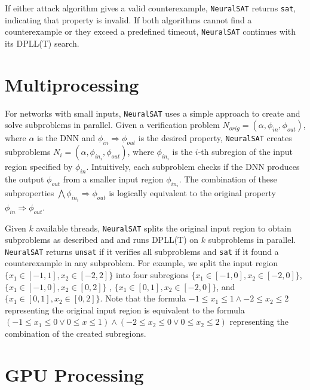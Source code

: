 \documentclass[oneside,11pt,dvipsnames]{book}
\numberwithin{equation}{section}
\theoremstyle{definition}
\theoremstyle{remark}
\newcommand{\tvn}[1]{\iftoggle{usecomment}{{\color{red}{[TVN]: #1}}}{}}
\newcommand{\tool}{\texttt{NeuralSAT}}
\begin{document}
If either attack algorithm gives a valid counterexample, \tool{} returns \texttt{sat}, indicating that property is invalid. If both algorithms cannot find a counterexample or they exceed a predefined timeout, \tool{} continues with its DPLL(T) search.



\section{Multiprocessing} \label{sec:input_split}
\tvn{Do we still use this?  or we use the Parallel DPLL(T) in~\autoref{sec:parallel-search} instead?}
For networks with small inputs, \tool{} uses a simple approach to create and solve subproblems in parallel.
Given a verification problem $N_{orig} = (\alpha, \phi_{in}, \phi_{out})$, where $\alpha$ is the DNN and $\phi_{in} \Rightarrow \phi_{out}$ is the desired property, \tool{} creates subproblems $N_i = (\alpha, \phi_{{in}_i}, \phi_{out})$, where $\phi_{{in}_i}$ is the $i$-th subregion of the input region specified by $\phi_{in}$.
Intuitively, each subproblem checks if the DNN produces the output $\phi_{out}$  from a smaller input region $\phi_{{in}_i}$.
The combination of these subproperties $\bigwedge \phi_{{in}_i} \Rightarrow \phi_{out}$ is logically equivalent to the original property $\phi_{in} \Rightarrow \phi_{out}$.


Given $k$ available threads, \tool{} splits the original input region to obtain subproblems as described and and runs DPLL(T) on $k$ subproblems in parallel. %
\tool{} returns \texttt{unsat} if it verifies all subproblems and \texttt{sat} if it found a counterexample in any subproblem. %
For example, we split the input region $\{x_1 \in [-1,1] , x_2 \in [-2,2]\}$ into four subregions
$\{x_1 \in [-1,0] , x_2 \in [-2,0]\}$,
$\{x_1 \in [-1,0] , x_2 \in [0,2]\}$ ,
$\{x_1 \in [0,1] , x_2 \in [-2,0]\}$, and
$\{x_1 \in [0,1], x_2 \in [0,2]\}$.
Note that the formula $-1 \le x_1 \le 1 \land -2 \le x_2 \le 2$ representing the original input region is equivalent to the formula $(-1 \le x_1 \le 0 \lor 0 \le x \le 1) \land (-2 \le x_2 \le 0 \lor 0 \le x_2 \le 2)$ representing the combination of the created subregions.



\section{GPU Processing}\label{sec:gpu}
\end{document}
